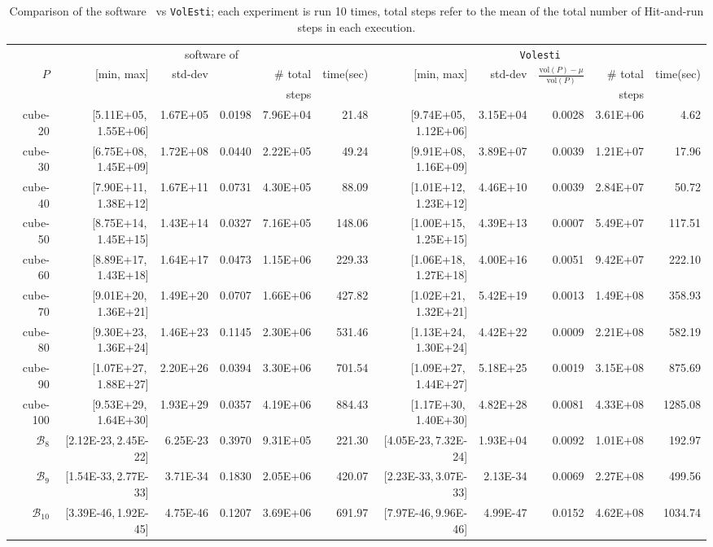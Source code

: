 \documentclass[11pt,a4paper]{article}
\def\B{{\mathcal B}} \def\E{{\mathcal E}}
\def\vol{\mbox{vol}}
\def\vol{\mbox{vol}}
\begin{document}
\begin{table}[t!]\centering\tiny
\begin{tabular*}{\linewidth}{@{\extracolsep{\fill}}r@{\,}|@{\,}r@{\,}
r@{\,}r@{\,}r@{\,}r@{\,}|@{\,}r@{\,}r@{\,}r@{\,}r@{\,}r}
& \multicolumn{5}{c}{software of~\cite{CousinsV13}} & \multicolumn{5}{c}{{\tt Volesti}}\\
 $P$  & [min, max]  & std-dev & {\tiny \multirow{2}{*}{$\frac{\vol(P)-\mu}{\vol(P)}$}} & \# total & time(sec)
  & [min, max]  & std-dev & \multirow{2}{*}{$\frac{\vol(P)-\mu}{\vol(P)}$} & \# total & time(sec)\\
 &&&&steps&&&&&steps& \\\hline
cube-20  & [5.11E+05,\,1.55E+06] & 1.67E+05 & 0.0198 & 7.96E+04 & 21.48 & [9.74E+05,\,1.12E+06] & 3.15E+04 & 0.0028 & 3.61E+06 &  4.62\\
cube-30  & [6.75E+08,\,1.45E+09] & 1.72E+08 & 0.0440 & 2.22E+05 &  49.24 & [9.91E+08,\,1.16E+09] & 3.89E+07 & 0.0039 & 1.21E+07 &  17.96\\
cube-40  & [7.90E+11,\,1.38E+12] & 1.67E+11 & 0.0731 & 4.30E+05 &  88.09 & [1.01E+12,\,1.23E+12] & 4.46E+10 & 0.0039 & 2.84E+07 &  50.72\\
cube-50  & [8.75E+14,\,1.45E+15] & 1.43E+14 & 0.0327 & 7.16E+05 &  148.06 & [1.00E+15,\,1.25E+15] & 4.39E+13 & 0.0007 & 5.49E+07 &  117.51\\
cube-60  & [8.89E+17,\,1.43E+18] & 1.64E+17 & 0.0473 & 1.15E+06 &  229.33 & [1.06E+18,\,1.27E+18] & 4.00E+16 & 0.0051 & 9.42E+07 &  222.10\\
cube-70  & [9.01E+20,\,1.36E+21] & 1.49E+20 & 0.0707 & 1.66E+06 &  427.82 & [1.02E+21,\,1.32E+21] & 5.42E+19 & 0.0013 & 1.49E+08 &  358.93\\
cube-80  & [9.30E+23,\,1.36E+24] & 1.46E+23 & 0.1145 & 2.30E+06 &  531.46 & [1.13E+24,\,1.30E+24] & 4.42E+22 & 0.0009 & 2.21E+08 &  582.19\\
cube-90  & [1.07E+27,\,1.88E+27] & 2.20E+26 & 0.0394 & 3.30E+06 &  701.54 & [1.09E+27,\,1.44E+27] & 5.18E+25 & 0.0019 & 3.15E+08 &  875.69\\
cube-100 & [9.53E+29,\,1.64E+30] & 1.93E+29 & 0.0357 & 4.19E+06 &  884.43 & [1.17E+30,\,1.40E+30] & 4.82E+28 & 0.0081 & 4.33E+08 &  1285.08\\
$\B_{8}$   & [2.12E-23,\,2.45E-22] & 6.25E-23 & 0.3970 & 9.31E+05 &  221.30 & [4.05E-23,\,7.32E-24] & 1.93E+04 & 0.0092 & 1.01E+08 & 192.97\\
$\B_{9}$   & [1.54E-33,\,2.77E-33] & 3.71E-34 & 0.1830 & 2.05E+06 &  420.07 & [2.23E-33,\,3.07E-33] & 2.13E-34 & 0.0069 & 2.27E+08 & 499.56\\
$\B_{10}$  & [3.39E-46,\,1.92E-45] & 4.75E-46 & 0.1207 & 3.69E+06 &  691.97 & [7.97E-46,\,9.96E-46] & 4.99E-47 & 0.0152 & 4.62E+08 & 1034.74\\
\end{tabular*} 
\caption{ Comparison of the software~\cite{CousinsV13} vs {\tt VolEsti}; each experiment is run 10 times, total steps refer to the mean of the total number of Hit-and-run steps in each execution.\label{table:matlab}}
\end{table} 
\end{document}

